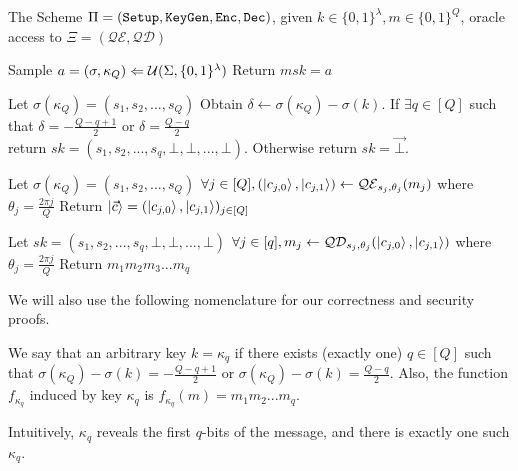 \begin{algorithm}[h]
\caption{The Scheme $\Pi = (\texttt{Setup},\texttt{KeyGen},\texttt{Enc},\texttt{Dec})$, given $k \in \{0,1\}^\lambda, m \in \{0,1\}^Q$, oracle access to $\Xi = (\mathcal{QE},\mathcal{QD})$}
\label{alg:pi}

\begin{algorithmic}

\State Sample $a = (\sigma,\kappa_Q) \Leftarrow \mathcal{U}(\Sigma,\{0,1\}^\lambda)$
\State Return $msk = a$
\EndProcedure

\State Let $\sigma(\kappa_Q) = (s_1,s_2,...,s_Q)$
\State Obtain $\delta \leftarrow \sigma(\kappa_Q) - \sigma(k)$.
\State If $\exists q \in [Q]$ such that $\delta = -\frac{Q-q+1}{2}$ or $\delta = \frac{Q-q}{2}$ \\ return $sk = (s_1,s_2,...,s_q,\bot,\bot,...,\bot)$.
\State Otherwise return $sk = \vec\bot$.
\EndProcedure

\State Let $\sigma(\kappa_Q) = (s_1,s_2,...,s_Q)$
\State $\forall j \in [Q], (\ket{c_{j,0}}, \ket{c_{j,1}}) \leftarrow \mathcal{QE}_{s_j,\theta_j}(m_j)$ where $\theta_j = \frac{2 \pi j}{Q}$
\State Return $\ket{\vec c} = (\ket{c_{j,0}}, \ket{c_{j,1}})_{j \in [Q]}$
\EndProcedure

\State Let $sk = (s_1,s_2,...,s_q,\bot, \bot, ..., \bot)$ 
\State $\forall j \in [q],  m_j \leftarrow \mathcal{QD}_{s_j,\theta_j}(\ket{c_{j,0}}, \ket{c_{j,1}})$ where $\theta_j = \frac{2 \pi j}{Q}$
\State Return $m_1m_2m_3...m_q$
\EndProcedure

\end{algorithmic}
\end{algorithm}

\noindent We will also use the following nomenclature for our correctness and security proofs.

\begin{definition}
\label{def:key-f}
We say that an arbitrary key $k = \kappa_q$ if there exists (exactly one) $q \in [Q]$ such that $\sigma(\kappa_Q) - \sigma(k) = -\frac{Q-q+1}{2}$ or 
$\sigma(\kappa_Q) - \sigma(k) = \frac{Q-q}{2}$. Also, the function $f_{\kappa_q}$ induced by key $\kappa_q$ is $f_{\kappa_q}(m) = m_1m_2...m_q$.
\end{definition}
\noindent Intuitively, $\kappa_q$ reveals the first $q$-bits of the message, and there is exactly one such $\kappa_q$.

